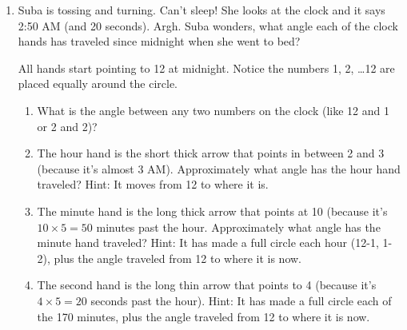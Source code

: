 \begin{enumerate}
\item %
Suba is tossing and turning.  Can't sleep!  She looks at the clock and it says 2:50 AM (and 20 seconds). Argh.  Suba wonders, what angle each of the clock hands has traveled since midnight when she went to bed?  

\begin{center}
\end{center}

All hands start pointing to 12 at midnight.  Notice the numbers 1, 2, \ldots 12 are placed equally around the circle.
\begin{enumerate}
    \item What is the angle between any two numbers on the clock (like 12 and 1 or 2 and 2)?
    \item The hour hand is the short thick arrow that points in between 2 and 3 (because it's almost 3 AM).  Approximately what angle has the hour hand traveled?  Hint: It moves from 12 to where it is.
    \item The minute hand is the long thick arrow that points at 10 (because it's $10 \times 5 = 50$ minutes past the hour.  Approximately what angle has the minute hand traveled?  Hint: It has made a full circle each hour (12-1, 1-2), plus the angle traveled from 12 to where it is now.
    \item The second hand is the long thin arrow that points to 4 (because it's $4 \times 5 = 20$ seconds past the hour). Hint: It has made a full circle each of the 170 minutes, plus the angle traveled from 12 to where it is now.
\end{enumerate}


\end{enumerate}
